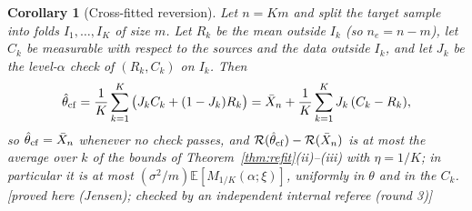 \documentclass[10pt,a4paper]{article}
\theoremstyle{plain}
\newtheorem{corollary}[theorem]{Corollary}
\theoremstyle{definition}
\theoremstyle{remark}
\newcommand{\E}{\mathbb{E}}
\newcommand{\risk}{\mathcal{R}}
\newcommand{\status}[1]{\textsf{\small [#1]}}
\begin{document}
\begin{corollary}[Cross-fitted reversion]\label{cor:crossfit}
Let $n=Km$ and split the target sample into folds $I_1,\dots,I_K$ of size $m$. Let $R_k$ be the mean outside $I_k$ (so $n_e=n-m$), let $C_k$ be measurable with respect to the sources and the data outside $I_k$, and let $J_k$ be the level-$\alpha$ check of $(R_k,C_k)$ on $I_k$. Then
\[
\hat\theta_{\rm cf}=\frac1K\sum_{k=1}^K\big(J_kC_k+(1-J_k)R_k\big)=\bar X_n+\frac1K\sum_{k=1}^KJ_k\,(C_k-R_k),
\]
so $\hat\theta_{\rm cf}=\bar X_n$ whenever no check passes, and $\risk(\hat\theta_{\rm cf})-\risk(\bar X_n)$ is at most the average over $k$ of the bounds of Theorem~\ref{thm:refit}(ii)--(iii) with $\eta=1/K$; in particular it is at most $(\sigma^2/m)\E[M_{1/K}(\alpha;\xi)]$, uniformly in $\theta$ and in the $C_k$. \status{proved here (Jensen); checked by an independent internal referee (round 3)}
\end{corollary}
\end{document}
